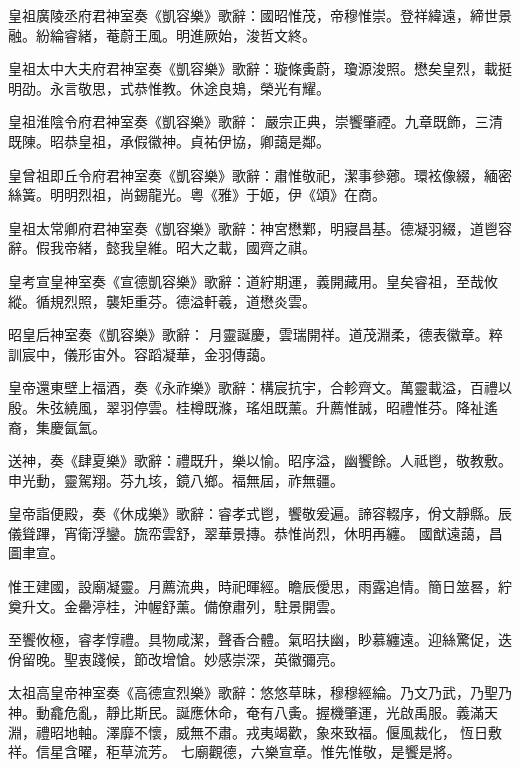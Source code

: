 \begin{pinyinscope}
 皇祖廣陵丞府君神室奏《凱容樂》歌辭：國昭惟茂，帝穆惟崇。登祥緯遠，締世景融。紛綸睿緒，菴蔚王風。明進厥始，浚哲文終。



 皇祖太中大夫府君神室奏《凱容樂》歌辭：璇條夤蔚，瓊源浚照。懋矣皇烈，載挺明劭。永言敬思，式恭惟教。休途良鳷，榮光有耀。



 皇祖淮陰令府君神室奏《凱容樂》歌辭：
 嚴宗正典，崇饗肇禋。九章既飾，三清既陳。昭恭皇祖，承假徽神。貞祐伊協，卿藹是鄰。



 皇曾祖即丘令府君神室奏《凱容樂》歌辭：肅惟敬祀，潔事參薌。環袨像綴，緬密絲簧。明明烈祖，尚錫龍光。粵《雅》于姬，伊《頌》在商。



 皇祖太常卿府君神室奏《凱容樂》歌辭：神宮懋鄴，明寢昌基。德凝羽綴，道鬯容辭。假我帝緒，懿我皇維。昭大之載，國齊之祺。



 皇考宣皇神室奏《宣德凱容樂》歌辭：道紵期運，義開藏用。皇矣睿祖，至哉攸縱。循規烈照，襲矩重芬。德溢軒羲，道懋炎雲。



 昭皇后神室奏《凱容樂》歌辭：
 月靈誕慶，雲瑞開祥。道茂淵柔，德表徽章。粹訓宸中，儀形宙外。容蹈凝華，金羽傳藹。



 皇帝還東壁上福酒，奏《永祚樂》歌辭：構宸抗宇，合軫齊文。萬靈載溢，百禮以殷。朱弦繞風，翠羽停雲。桂樽既滌，瑤俎既薰。升薦惟誠，昭禮惟芬。降祉遙裔，集慶氤氳。



 送神，奏《肆夏樂》歌辭：禮既升，樂以愉。昭序溢，幽饗餘。人祗鬯，敬教敷。申光動，靈駕翔。芬九垓，鏡八鄉。福無屆，祚無疆。



 皇帝詣便殿，奏《休成樂》歌辭：睿孝式鬯，饗敬爰遍。諦容輟序，佾文靜縣。辰儀聳蹕，宵衛浮鑾。旒帟雲舒，翠華景摶。恭惟尚烈，休明再纏。
 國猷遠藹，昌圖聿宣。



 惟王建國，設廟凝靈。月薦流典，時祀暉經。瞻辰僾思，雨露追情。簡日筮晷，紵奠升文。金罍渟桂，沖幄舒薰。備僚肅列，駐景開雲。



 至饗攸極，睿孝惇禮。具物咸潔，聲香合體。氣昭扶幽，眇慕纏遠。迎絲驚促，迭佾留晚。聖衷踐候，節改增愴。妙感崇深，英徽彌亮。



 太祖高皇帝神室奏《高德宣烈樂》歌辭：悠悠草昧，穆穆經綸。乃文乃武，乃聖乃神。動龕危亂，靜比斯民。誕應休命，奄有八夤。握機肇運，光啟禹服。義滿天淵，禮昭地軸。澤靡不懷，威無不肅。戎夷竭歡，象來致福。偃風裁化，恆日敷祥。信星含曜，秬草流芳。
 七廟觀德，六樂宣章。惟先惟敬，是饗是將。




\end{pinyinscope}
